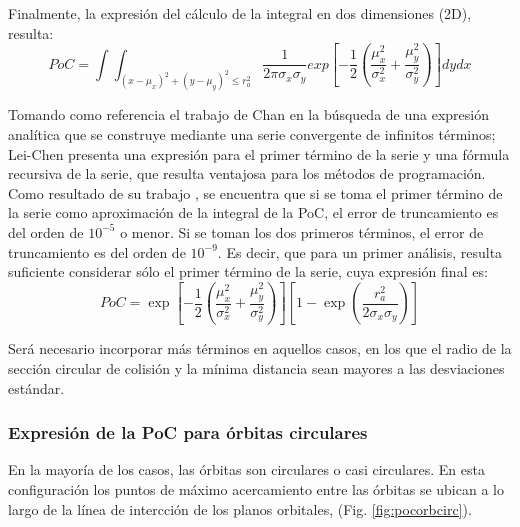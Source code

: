 Finalmente, la expresi\'on del c\'alculo de la integral en dos dimensiones (2D), resulta:\\

\begin{equation}
 PoC=\int \int_{(x-\mu_{x})^{2}+(y-\mu_{y})^{2}\leq r_{a}^{2}} \frac{1}{2\pi\sigma_{x}\sigma_{y}} exp [-\frac{1}{2}(\frac{\mu_{x}^{2}}{\sigma_{x}^{2}}+\frac{\mu_{y}^{2}}{\sigma_{y}^{2}}) ] dy dx
 \label{eq:pocintegral}
\end{equation}

Tomando como referencia el trabajo de Chan \citep{chan2003improved} en la b\'usqueda de una expresi\'on anal\'itica que se construye mediante una serie convergente de infinitos t\'erminos; Lei-Chen presenta una expresi\'on para el primer t\'ermino de la serie y una f\'ormula recursiva de la serie, que resulta ventajosa para los m\'etodos de programaci\'on.\\

Como resultado de su trabajo \citep{lei2009rapid}, se encuentra que si se toma el primer t\'ermino de la serie como aproximaci\'on de la integral de la PoC,  el error de truncamiento es del orden de $10^{-5}$ o menor. Si se toman los dos primeros t\'erminos, el error de truncamiento es del orden de $10^{-9}$. Es decir, que para un primer an\'alisis, resulta suficiente considerar s\'olo el primer t\'ermino de la serie, cuya expresi\'on final es:\\


\begin{equation}
 PoC= \exp[-\frac{1}{2}(\frac{\mu_{x}^{2}}{\sigma_{x}^{2}}+\frac{\mu_{y}^{2}}{\sigma_{y}^{2}})][1-\exp(\frac{r_{a}^{2}}{2\sigma_{x}\sigma_{y}})]
 \label{eq:pocexpress}
\end{equation}

Ser\'a necesario incorporar m\'as t\'erminos en aquellos casos, en los que el radio de la secci\'on circular de colisi\'on y la m\'inima distancia sean mayores a las desviaciones est\'andar.

\subsubsection*{Expresi\'on de la PoC para \'orbitas circulares}

En la mayor\'ia de los casos, las \'orbitas son circulares o casi circulares. En esta configuraci\'on  los puntos de m\'aximo acercamiento entre las \'orbitas se ubican a lo largo de la l\'inea de intercci\'on de los planos orbitales, (Fig. \ref{fig:pocorbcirc}).\\ %


